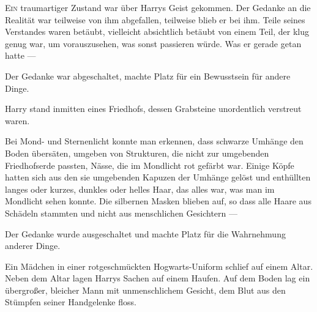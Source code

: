 
\lettrine{E}{in} traumartiger Zustand war über Harrys Geist gekommen. Der Gedanke an die Realität war teilweise von ihm abgefallen, teilweise blieb er bei ihm. Teile seines Verstandes waren betäubt, vielleicht absichtlich betäubt von einem Teil, der klug genug war, um vorauszusehen, was sonst passieren würde.
Was er gerade getan hatte —

Der Gedanke war abgeschaltet, machte Platz für ein Bewusstsein für andere Dinge.

Harry stand inmitten eines Friedhofs, dessen Grabsteine unordentlich verstreut waren.

Bei Mond- und Sternenlicht konnte man erkennen, dass schwarze Umhänge den Boden übersäten, umgeben von Strukturen, die nicht zur umgebenden Friedhofserde passten, Nässe, die im Mondlicht rot gefärbt war. Einige Köpfe hatten sich aus den sie umgebenden Kapuzen der Umhänge gelöst und enthüllten langes oder kurzes, dunkles oder helles Haar, das alles war, was man im Mondlicht sehen konnte. Die silbernen Masken blieben auf, so dass alle Haare aus Schädeln stammten und nicht aus menschlichen Gesichtern —

Der Gedanke wurde ausgeschaltet und machte Platz für die Wahrnehmung anderer Dinge.

Ein Mädchen in einer rotgeschmückten Hogwarts-Uniform schlief auf einem Altar.
Neben dem Altar lagen Harrys Sachen auf einem Haufen.
Auf dem Boden lag ein übergroßer, bleicher Mann mit unmenschlichem Gesicht, dem Blut aus den Stümpfen seiner Handgelenke floss.

